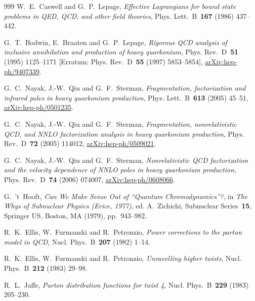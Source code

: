\begin{thebibliography}{999}
W.~E.~Caswell and G.~P.~Lepage, \emph{Effective Lagrangians for bound state problems in QED, QCD, and other field theories}, Phys. Lett.~B~\textbf{167} (1986) \mbox{437--442}.

G.~T.~Bodwin, E.~Braaten and G.~P.~Lepage, \emph{Rigorous QCD analysis of inclusive annihilation and production of heavy quarkonium}, Phys. Rev.~D~\textbf{51} (1995) \mbox{1125--1171} [Erratum: Phys. Rev.~D~\textbf{55} (1997) \mbox{5853--5854}], \href{https://arxiv.org/abs/hep-ph/9407339}{arXiv:hep-ph/9407339}.

G.~C.~Nayak, J.-W.~Qiu and G.~F.~Sterman, \emph{Fragmentation, factorization and infrared poles in heavy quarkonium production}, Phys. Lett.~B~\textbf{613} (2005) \mbox{45--51}, \href{https://arxiv.org/abs/hep-ph/0501235}{arXiv:hep-ph/0501235}.

G.~C.~Nayak, J.-W.~Qiu and G.~F.~Sterman, \emph{Fragmentation, nonrelativistic QCD, and NNLO factorization analysis in heavy quarkonium production}, Phys. Rev.~D~\textbf{72} (2005) \mbox{114012}, \href{https://arxiv.org/abs/hep-ph/0509021}{arXiv:hep-ph/0509021}.

G.~C.~Nayak, J.-W.~Qiu and G.~F.~Sterman, \emph{Nonrelativistic QCD factorization and the velocity dependence of NNLO poles in heavy quarkonium production}, Phys. Rev.~D~\textbf{74} (2006) \mbox{074007}, \href{https://arxiv.org/abs/hep-ph/0608066}{arXiv:hep-ph/0608066}.

G.~'t~Hooft, \emph{Can We Make Sense Out of ``Quantum Chromodynamics''?}, in \emph{The Whys of Subnuclear Physics (Erice, 1977)}, ed. A.~Zichichi, Subnuclear Series~\textbf{15}, Springer US, Boston, MA (1979), pp.~\mbox{943--982}.

R.~K.~Ellis, W.~Furmanski and R.~Petronzio, \emph{Power corrections to the parton model in QCD}, Nucl. Phys.~B~\textbf{207} (1982) \mbox{1--14}.

R.~K.~Ellis, W.~Furmanski and R.~Petronzio, \emph{Unravelling higher twists}, Nucl. Phys.~B~\textbf{212} (1983) \mbox{29--98}.

R.~L.~Jaffe, \emph{Parton distribution functions for twist 4}, Nucl. Phys.~B~\textbf{229} (1983) \mbox{205--230}.


\end{thebibliography}
